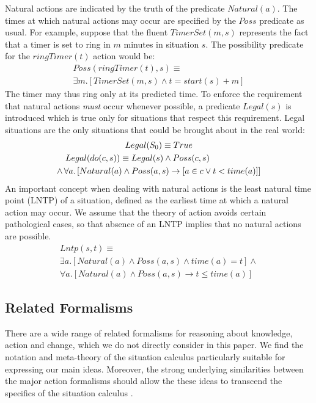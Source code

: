 Natural actions are indicated by the truth of the predicate $Natural(a)$.
The times at which natural actions may occur are specified by the
$Poss$ predicate as usual. For example, suppose that the fluent $TimerSet(m,s)$
represents the fact that a timer is set to ring in $m$ minutes in
situation $s$. The possibility predicate for the $ringTimer(t)$
action would be:\begin{multline*}
Poss(ringTimer(t),s)\equiv\\
\exists m.\left[TimerSet(m,s)\wedge t=start(s)+m\right]\end{multline*}
 The timer may thus ring only at its predicted time. To enforce the
requirement that natural actions \emph{must} occur whenever possible,
a predicate $Legal(s)$ is introduced which is true only for situations
that respect this requirement. Legal situations are the only situations
that could be brought about in the real world:\begin{multline*}
Legal(S_{0})\equiv True\\
\shoveleft{Legal(do(c,s))\equiv Legal(s)\wedge Poss(c,s)}\\
\wedge\,\forall a.\left[Natural(a)\wedge Poss(a,s)\rightarrow\left[a\in c\vee t<time(a)\right]\right]\end{multline*}
 An important concept when dealing with natural actions is the least
natural time point (LNTP) of a situation, defined as the earliest
time at which a natural action may occur. We assume that the theory
of action avoids certain pathological cases, so that absence of an
LNTP implies that no natural actions are possible.\begin{multline*}
Lntp(s,t)\equiv\\
\exists a.\left[Natural(a)\wedge Poss(a,s)\wedge time(a)=t\right]\wedge\\
\forall a.\left[Natural(a)\wedge Poss(a,s)\rightarrow t\leq time(a)\right]\end{multline*}



\subsection{Related Formalisms}

There are a wide range of related formalisms for reasoning about knowledge,
action and change, which we do not directly consider in this paper.
We find the notation and meta-theory of the situation calculus particularly
suitable for expressing our main ideas. Moreover, the strong underlying
similarities between the major action formalisms should allow the
these ideas to transcend the specifics of the situation calculus \citet{thielscher06reconcile_sc_fc,thielscher07unifying_action_calculus,vanbentham07ml_sitcalc}.



